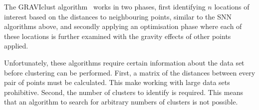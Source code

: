 The GRAVIclust algorithm~\cite{indulska2002gravity} works in two phases, first
identifying $n$ locations of interest based on the distances to neighbouring
points, similar to the SNN algorithms above, and secondly applying an
optimisation phase where each of these locations is further examined with the
gravity effects of other points applied.

Unfortunately, these algorithms require certain information about the data set
before clustering can be performed. First, a matrix of the distances between
every pair of points must be calculated. This make working with large data sets
prohibitive. Second, the number of clusters to identify is required. This means
that an algorithm to search for arbitrary numbers of clusters is not possible.
